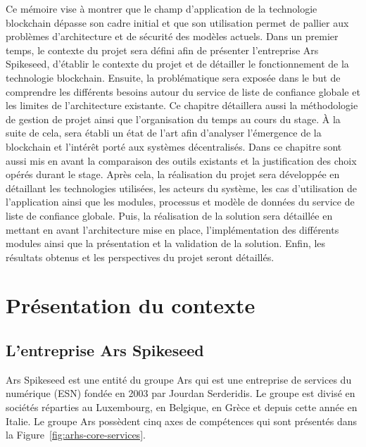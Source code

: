 \documentclass{tnreport}
\begin{document}

Ce mémoire vise à montrer que le champ d'application de la technologie blockchain dépasse son cadre initial et que son utilisation permet de pallier aux problèmes d'architecture et de sécurité des modèles actuels. 
Dans un premier temps, le contexte du projet sera défini afin de présenter l'entreprise Ar{\texteta}s Spikeseed, d'établir le contexte du projet et de détailler le fonctionnement de la technologie blockchain.
Ensuite, la problématique sera exposée dans le but de comprendre les différents besoins autour du service de liste de confiance globale et les limites de l'architecture existante. Ce chapitre détaillera aussi la méthodologie de gestion de projet ainsi que l'organisation du temps au cours du stage.
À la suite de cela, sera établi un état de l'art afin d'analyser l'émergence de la blockchain et l'intérêt porté aux systèmes décentralisés. Dans ce chapitre sont aussi mis en avant la comparaison des outils existants et la justification des choix opérés durant le stage. 
Après cela, la réalisation du projet sera développée en détaillant les technologies utilisées, les acteurs du système, les cas d'utilisation de l'application ainsi que les modules, processus et modèle de données du service de liste de confiance globale.
Puis, la réalisation de la solution sera détaillée en mettant en avant l'architecture mise en place, l'implémentation des différents modules ainsi que la présentation et la validation de la solution.
Enfin, les résultats obtenus et les perspectives du projet seront détaillés.

\chapter{Présentation du contexte}

\section{L'entreprise Ar{\texteta}s Spikeseed}

Ar{\texteta}s Spikeseed est une entité du groupe Ar{\texteta}s qui est une entreprise de services du numérique (ESN) fondée en 2003 par Jourdan Serderidis. 
Le groupe est divisé en sociétés réparties au Luxembourg, en Belgique, en Grèce et depuis cette année en Italie. Le groupe Ar{\texteta}s possèdent cinq axes de compétences qui sont présentés dans la Figure~\ref{fig:arhs-core-services}.
\end{document}
